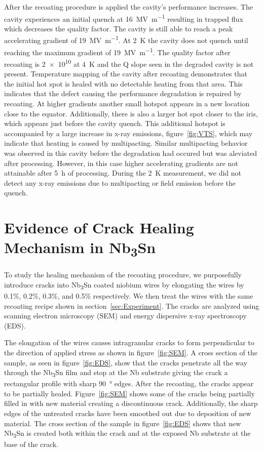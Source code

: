 After the recoating procedure is applied the cavity's performance increases. The cavity experiences an initial quench at \qty{16}{\mega\volt\per\meter} resulting in trapped flux which decreases the quality factor. The cavity is still able to reach a peak accelerating gradient of \qty{19}{\mega\volt\per\meter}. At \qty{2}{\kelvin} the cavity does not quench until reaching the maximum gradient of \qty{19}{\mega\volt\per\meter}. The quality factor after recoating is \num{2e10} at \qty{4}{\kelvin} and the Q slope seen in the degraded cavity is not present. Temperature mapping of the cavity after recoating demonstrates that the initial hot spot is healed with no detectable heating from that area. This indicates that the defect causing the performance degradation is repaired by recoating. At higher gradients another small hotspot appears in a new location close to the equator. Additionally, there is also a larger hot spot closer to the iris, which appears just before the cavity quench. This additional hotspot is accompanied by a large increase in x-ray emissions, figure~\ref{fig:VTS}, which may indicate that heating is caused by multipacting. Similar multipacting behavior was observed in this cavity before the degradation had occured but was aleviated after processing. However, in this case higher accelerating gradients are not attainable after \qty{5}{\hour} of processing. During the \qty{2}{\kelvin} measurement, we did not detect any x-ray emissions due to multipacting or field emission before the quench.

\section{Evidence of Crack Healing Mechanism in Nb\textsubscript{3}Sn}

To study the healing mechanism of the recoating procedure, we purposefully introduce cracks into Nb\textsubscript{3}Sn coated niobium wires by elongating the wires by 0.1\%, 0.2\%, 0.3\%, and 0.5\% respectively. We then treat the wires with the same recoating recipe shown in section~\ref{sec:Experiment}. The cracks are analyzed using scanning electron microscopy (SEM) and energy dispersive x-ray spectroscopy (EDS). 

The elongation of the wires causes intragranular cracks to form perpendicular to the direction of applied stress as shown in figure~\ref{fig:SEM}. A cross section of the sample, as seen in figure~\ref{fig:EDS}, show that the cracks penetrate all the way through the Nb\textsubscript{3}Sn film and stop at the Nb substrate giving the crack a rectangular profile with sharp \qty{90}{\degree} edges. After the recoating, the cracks appear to be partially healed. Figure~\ref{fig:SEM} shows some of the cracks being partially filled in with new material creating a discontinuous crack. Additionally, the sharp edges of the untreated cracks have been smoothed out due to deposition of new material. The cross section of the sample in figure~\ref{fig:EDS} shows that new Nb\textsubscript{3}Sn is created both within the crack and at the exposed Nb substrate at the base of the crack. 

